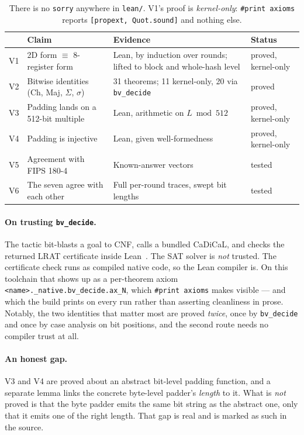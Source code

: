 \documentclass[11pt,a4paper]{article}
\newcommand{\code}[1]{\texttt{#1}}
\begin{document}
\begin{table}[h]
\centering
\small
\begin{tabular}{@{}clp{7.3cm}l@{}}
\toprule
& \textbf{Claim} & \textbf{Evidence} & \textbf{Status} \\
\midrule
V1 & 2D form $\equiv$ 8-register form & Lean, by induction over rounds; lifted to block and whole-hash level & proved, kernel-only \\
V2 & Bitwise identities (Ch, Maj, $\Sigma$, $\sigma$) & 31 theorems; 11 kernel-only, 20 via \code{bv\_decide} & proved \\
V3 & Padding lands on a 512-bit multiple & Lean, arithmetic on $L \bmod 512$ & proved, kernel-only \\
V4 & Padding is injective & Lean, given well-formedness & proved, kernel-only \\
V5 & Agreement with FIPS 180-4 & Known-answer vectors & tested \\
V6 & The seven agree with each other & Full per-round traces, swept bit lengths & tested \\
\bottomrule
\end{tabular}
\caption{There is no \code{sorry} anywhere in \texttt{lean/}. V1's proof is
\emph{kernel-only}: \code{\#print axioms} reports \code{[propext, Quot.sound]}
and nothing else.}
\label{tab:verif}
\end{table}

\paragraph{On trusting \code{bv\_decide}.}
The tactic bit-blasts a goal to CNF, calls a bundled CaDiCaL, and checks the
returned LRAT certificate inside Lean~\cite{boving2025bvdecide}. The SAT
solver is \emph{not} trusted. The certificate check runs as compiled native
code, so the Lean compiler is. On this toolchain that shows up as a
per-theorem axiom \code{<name>.\_native.bv\_decide.ax\_N}, which
\code{\#print axioms} makes visible --- and which the build prints on every
run rather than asserting cleanliness in prose. Notably, the two identities
that matter most are proved \emph{twice}, once by \code{bv\_decide} and once
by case analysis on bit positions, and the second route needs no compiler
trust at all.

\paragraph{An honest gap.} V3 and V4 are proved about an abstract bit-level
padding function, and a separate lemma links the concrete byte-level padder's
\emph{length} to it. What is \emph{not} proved is that the byte padder emits
the same bit string as the abstract one, only that it emits one of the right
length. That gap is real and is marked as such in the source.
\end{document}
